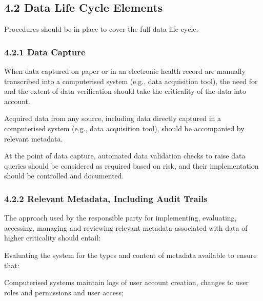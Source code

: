 \documentclass[11pt]{article}
\begin{document}
\subsection{4.2 Data Life Cycle Elements}

Procedures should be in place to cover the full data life cycle.


\subsubsection{4.2.1 Data Capture}

\begin{description}[leftmargin=2.5cm,style=sameline]

\item[(a)] When data captured on paper or in an electronic health record are manually transcribed into a computerised system (e.g., data acquisition tool), the need for and the extent of data verification should take the criticality of the data into account.

\item[(b)] Acquired data from any source, including data directly captured in a computerised system (e.g., data acquisition tool), should be accompanied by relevant metadata.

\item[(c)] At the point of data capture, automated data validation checks to raise data queries should be considered as required based on risk, and their implementation should be controlled and documented.

\end{description}

\subsubsection{4.2.2 Relevant Metadata, Including Audit Trails}

The approach used by the responsible party for implementing, evaluating, accessing, managing and reviewing relevant metadata associated with data of higher criticality should entail:


\begin{description}[leftmargin=2.5cm,style=sameline]

\item[(a)] Evaluating the system for the types and content of metadata available to ensure that:

\item[(i)] Computerised systems maintain logs of user account creation, changes to user roles and permissions and user access;

\end{description}
\end{document}

